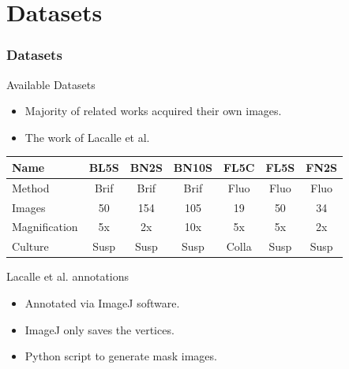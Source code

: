 \section{Datasets}


\begin{frame}{}
    \frametitle{Datasets}
\end{frame}


\begin{frame}{Available Datasets}

    \begin{itemize}
        \item Majority of related works acquired their own images.
        \item The work of Lacalle et al.
    \end{itemize}

    \begin{table}[]
        \centering
        \setlength{\tabcolsep}{10pt}
        
        {
            \begin{tabular}{lcccccc}
                \textbf{Name} & \textbf{BL5S} & \textbf{BN2S} & \textbf{BN10S} & \textbf{FL5C} & \textbf{FL5S} & \textbf{FN2S} \\
                \midrule
                Method & Brif & Brif & Brif & Fluo & Fluo & Fluo \\
                Images & 50 & 154 & 105 & 19 & 50 & 34 \\
                Magnification & 5x & 2x & 10x & 5x & 5x & 2x \\
                Culture & Susp & Susp & Susp & Colla & Susp & Susp
            \end{tabular}
        }
    \end{table}
\end{frame}

\begin{frame}{Lacalle et al. annotations}
   \begin{itemize}
       \item Annotated via ImageJ software.
       \item ImageJ only saves the vertices.
       \item Python script to generate mask images.
   \end{itemize}
\end{frame}

